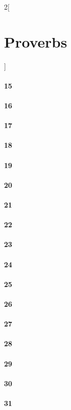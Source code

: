 \documentclass{book}
\begin{document}
\begin{multicols}{2}[\part{Proverbs}]
\subsection*{15}
\subsection*{16}
\subsection*{17}
\subsection*{18}
\subsection*{19}
\subsection*{20}
\subsection*{21}
\subsection*{22}
\subsection*{23}
\subsection*{24}
\subsection*{25}
\subsection*{26}
\subsection*{27}
\subsection*{28}
\subsection*{29}
\subsection*{30}
\subsection*{31}
\end{multicols}
\end{document}
